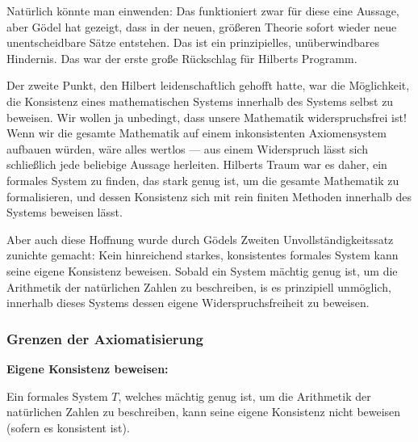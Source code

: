\begin{math-stroke}
\end{math-stroke}

\begin{spoken-clean}[01:01:38 - 01:03:50]
Natürlich könnte man einwenden:  Das funktioniert zwar für diese eine Aussage, aber Gödel hat gezeigt, dass in der neuen, größeren Theorie sofort wieder neue unentscheidbare Sätze entstehen. Das ist ein prinzipielles, unüberwindbares Hindernis. Das war der erste große Rückschlag für Hilberts Programm.

Der zweite Punkt, den Hilbert leidenschaftlich gehofft hatte, war die Möglichkeit, die Konsistenz eines mathematischen Systems innerhalb des Systems selbst zu beweisen. Wir wollen ja unbedingt, dass unsere Mathematik widerspruchsfrei ist! Wenn wir die gesamte Mathematik auf einem inkonsistenten Axiomensystem aufbauen würden, wäre alles wertlos --- aus einem Widerspruch lässt sich schließlich jede beliebige Aussage herleiten. Hilberts Traum war es daher, ein formales System zu finden, das stark genug ist, um die gesamte Mathematik zu formalisieren, und dessen Konsistenz sich mit rein finiten Methoden innerhalb des Systems beweisen lässt.

Aber auch diese Hoffnung wurde durch Gödels Zweiten Unvollständigkeitssatz zunichte gemacht: Kein hinreichend starkes, konsistentes formales System kann seine eigene Konsistenz beweisen. Sobald ein System mächtig genug ist, um die Arithmetik der natürlichen Zahlen zu beschreiben, is es prinzipiell unmöglich, innerhalb dieses Systems dessen eigene Widerspruchsfreiheit zu beweisen.
\end{spoken-clean}

\subsubsection{Grenzen der Axiomatisierung}
\begin{math-stroke}
\textbf{Eigene Konsistenz beweisen:}

Ein formales System $T$, welches mächtig genug ist, um die Arithmetik der natürlichen Zahlen zu beschreiben, kann seine eigene Konsistenz nicht beweisen (sofern es konsistent ist).
\end{math-stroke}

